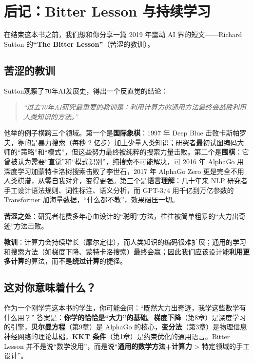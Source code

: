 \chapter*{后记：Bitter Lesson 与持续学习}
在结束这本书之前，我们想和你分享一篇 2019 年震动 AI 界的短文——Richard Sutton 的\textbf{``The Bitter Lesson''}（苦涩的教训）。
\section*{苦涩的教训}
Sutton观察了70年AI发展史，得出一个反直觉的结论：
\begin{quote}
\textit{``过去70年AI研究最重要的教训是：利用计算力的通用方法最终会战胜利用人类知识的方法。''}
\end{quote}
他举的例子横跨三个领域。第一个是\textbf{国际象棋}：1997 年 Deep Blue 击败卡斯帕罗夫，靠的是暴力搜索（每秒 2 亿步）加上少量人类知识；研究者最初试图编码大师的``策略''和``模式''，但这些努力最终被纯粹的搜索力量击败。第二个是\textbf{围棋}：它曾被认为需要``直觉''和``模式识别''，纯搜索不可能解决，可 2016 年 AlphaGo 用深度学习加蒙特卡洛树搜索击败了李世石，2017 年 AlphaGo Zero 更是完全不用人类棋谱，从零自我对弈，变得更强。第三个是\textbf{语言理解}：几十年来 NLP 研究者手工设计语法规则、词性标注、语义分析，而 GPT-3/4 用千亿到万亿参数的 Transformer 加海量数据，``什么都不教''，效果碾压一切。
\begin{tcolorbox}[colback=red!5, colframe=red!60!black, title=Bitter Lesson的核心]
\textbf{苦涩之处}：研究者花费多年心血设计的``聪明''方法，往往被简单粗暴的``大力出奇迹''方法击败。

\textbf{教训}：计算力会持续增长（摩尔定律），而人类知识的编码很难扩展；通用的学习和搜索方法（如梯度下降、蒙特卡洛搜索）最终会赢；因此我们应该设计能\textbf{利用更多计算}的算法，而不是\textbf{绕过计算}的捷径。
\end{tcolorbox}
\section*{这对你意味着什么？}
作为一个刚学完这本书的学生，你可能会问：``既然大力出奇迹，我学这些数学有什么用？''
答案是：\textbf{你学的恰恰是``大力''的基础}。\textbf{梯度下降}（第8章）是深度学习的引擎，\textbf{贝尔曼方程}（第9章）是 AlphaGo 的核心，\textbf{变分法}（第3章）是物理信息神经网络的理论基础，\textbf{KKT 条件}（第1章）是约束优化的通用语言。Bitter Lesson 并不是说``数学没用''，而是说``\textbf{通用的数学方法+计算力} > 特定领域的手工设计''。
